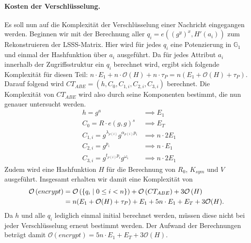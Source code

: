 \paragraph{Kosten der Verschlüsselung.}
Es soll nun auf die Komplexität der Verschlüsselung einer Nachricht eingegangen
werden. Beginnen wir mit der Berechnung aller $q_i = e\left((g^y)^x,
H'(a_i)\right)$ zum Rekonstruieren der LSSS-Matrix. Hier wird für jedes $q_i$
eine Potenzierung in $\mathbb{G}_1$ und einmal der Hashfunktion über $a_i$
ausgeführt. Da für jedes Attribut $a_i$ innerhalb der Zugriffsstruktur ein $q_i$
berechnet wird, ergibt sich folgende Komplexität für diesen Teil: $n \cdot E_1 +
n \cdot \mathcal{O}(H) + n \cdot \tau_P = n (E_1 + \mathcal{O}(H) + \tau_P)$.
Darauf folgend wird $CT_{ABE} = (h, C_0, C_{1,i}, C_{2,i}, C_{3,i})$ berechnet.
Die Komplexität von $CT_{ABE}$ wird also durch seine Komponenten bestimmt, die
nun genauer untersucht werden.
\begin{align*}
  & h = g^a & \implies E_1 \\
  & C_0 = R \cdot e(g, g)^s & \implies E_T \\
  & C_{1,i} = g^{\lambda_{\rho(i)}}g^{\alpha_{\rho(i)}p_i} & \implies n \cdot 2E_1 \\
  & C_{2,i} = g^{p_i} & \implies n \cdot E_1 \\
  & C_{3,i} = g^{t_{\rho(i)}p_i}g^{\omega_i} & \implies n \cdot 2E_1
\end{align*}
Zudem wird eine Hashfunktion $H$ für die Berechnung von $R_0$, $K_{sym}$ und $V$
ausgeführt. Insgesamt erhalten wir damit eine Komplexität von
\begin{align*}
  \mathcal{O} \left( encrypt \right) &= \mathcal{O} \left( \{ q_i \;\vert\; 0 \leq i < n \} \right) + \mathcal{O} \left( CT_{ABE} \right) + 3\mathcal{O} \left( H \right) \\
  &= n (E_1 + \mathcal{O}(H) + \tau_P) + E_1 + 5n \cdot E_1
  + E_T + 3\mathcal{O}(H).
\end{align*}
Da $h$ und alle $q_i$ lediglich einmal initial berechnet werden,
müssen diese nicht bei jeder Verschlüsselung erneut bestimmt werden. Der Aufwand
der Berechnungen beträgt damit $\mathcal{O}(encrypt) = 5n \cdot E_1 + E_T +
3\mathcal{O}(H)$.

